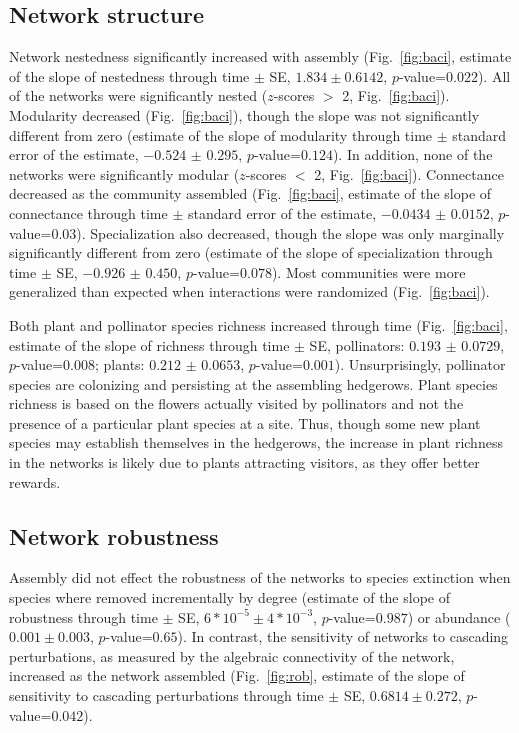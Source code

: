 \documentclass[12pt]{article}
\begin{document}
\subsection*{Network structure}
Network nestedness significantly increased with assembly
(Fig.~\ref{fig:baci}, estimate of the slope of nestedness through time
$\pm$ SE, $1.834 \pm 0.6142$, $p$-value=$0.022$). All of the networks
were significantly nested ($z$-scores $>$ 2,
Fig.~\ref{fig:baci}). Modularity decreased (Fig.~\ref{fig:baci}),
though the slope was not significantly different from zero (estimate
of the slope of modularity through time $\pm$ standard error of the
estimate, $-0.524$ $\pm$ $0.295$, $p$-value=$0.124$). In addition,
none of the networks were significantly modular ($z$-scores $<$ 2,
Fig.~\ref{fig:baci}). Connectance decreased as the community assembled
(Fig.~\ref{fig:baci}, estimate of the slope of connectance through
time $\pm$ standard error of the estimate, $-0.0434$ $\pm$ $0.0152$,
$p$-value=$0.03$). Specialization also decreased, though the slope was
only marginally significantly different from zero (estimate of the
slope of specialization through time $\pm$ SE, $-0.926$ $\pm$ $0.450$,
$p$-value=$0.078$). Most communities were more generalized than
expected when interactions were randomized (Fig.~\ref{fig:baci}).

Both plant and pollinator species richness increased through time
(Fig.~\ref{fig:baci}, estimate of the slope of richness through time
$\pm$ SE, pollinators: $0.193$ $\pm$ $0.0729$, $p$-value=$0.008$;
plants: $0.212$ $\pm$ $0.0653$, $p$-value=$0.001$). Unsurprisingly,
pollinator species are colonizing and persisting at the assembling
hedgerows. Plant species richness is based on the flowers actually
visited by pollinators and not the presence of a particular plant
species at a site. Thus, though some new plant species may establish
themselves in the hedgerows, the increase in plant richness in the
networks is likely due to plants attracting visitors, as they offer
better rewards.

\subsection*{Network robustness}
Assembly did not effect the robustness of the networks to species
extinction when species where removed incrementally by degree
(estimate of the slope of robustness through time $\pm$ SE, $6*10^{-5}
\pm 4*10^{-3}$, $p$-value=$0.987$) or abundance ($0.001 \pm 0.003$,
$p$-value=$0.65$). In contrast, the sensitivity of networks to
cascading perturbations, as measured by the algebraic connectivity of
the network, increased as the network assembled (Fig.~\ref{fig:rob},
estimate of the slope of sensitivity to cascading perturbations
through time $\pm$ SE, $0.6814 \pm 0.272$, $p$-value=$0.042$).
\end{document}
